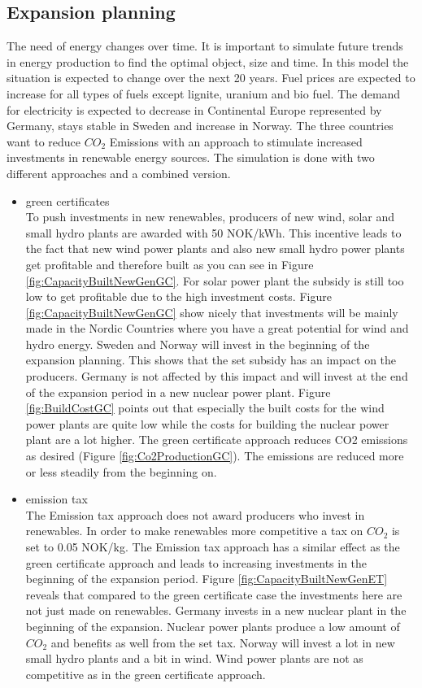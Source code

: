 \documentclass{article}
\begin{document}
\subsection{Expansion planning}
The need of energy changes over time. It is important to simulate future trends in energy production to find the optimal object, size and time. In this model the situation is expected to change over the next 20 years. Fuel prices are expected to increase for all types of fuels except lignite, uranium and bio fuel. The demand for electricity is expected to decrease in Continental Europe represented by Germany, stays stable in Sweden and increase in Norway. The three countries want to reduce $CO_2$ Emissions with an approach to stimulate increased investments in renewable energy sources. The simulation is done with two different approaches and a combined version.
\begin{itemize}
\item green certificates\\
To push investments in new renewables, producers of new wind, solar and small hydro plants are awarded with 50 NOK/kWh. This incentive leads to the fact that new wind power plants and also new small hydro power plants get profitable and therefore built as you can see in Figure \ref{fig:CapacityBuiltNewGenGC}. For solar power plant the subsidy is still too low to get profitable due to the high investment costs. Figure \ref{fig:CapacityBuiltNewGenGC} show nicely that investments will be mainly made in the Nordic Countries where you have a great potential for wind and hydro energy. Sweden and Norway will invest in the beginning of the expansion planning. This shows that the set subsidy has an impact on the producers. Germany is not affected by this impact and will invest at the end of the expansion period in a new nuclear power plant. Figure \ref{fig:BuildCostGC} points out that especially the built costs for the wind power plants are quite low while the costs for building the nuclear power plant are a lot higher. The green certificate approach reduces CO2 emissions as desired (Figure \ref{fig:Co2ProductionGC}). The emissions are reduced more or less steadily from the beginning on.
\item emission tax\\
The Emission tax approach does not award producers who invest in renewables. In order to make renewables more competitive a tax on $CO_2$ is set to 0.05 NOK/kg.  The Emission tax approach has a similar effect as the green certificate approach and leads to increasing investments in the beginning of the expansion period. Figure \ref{fig:CapacityBuiltNewGenET} reveals that compared to the green certificate case the investments here are not just made on renewables. Germany invests in a new nuclear plant in the beginning of the expansion. Nuclear power plants produce a low amount of $CO_2$ and benefits as well from the set tax. Norway will invest a lot in new small hydro plants and a bit in wind. Wind power plants are not as competitive as in the green certificate approach.\\

\end{itemize}
\end{document}
